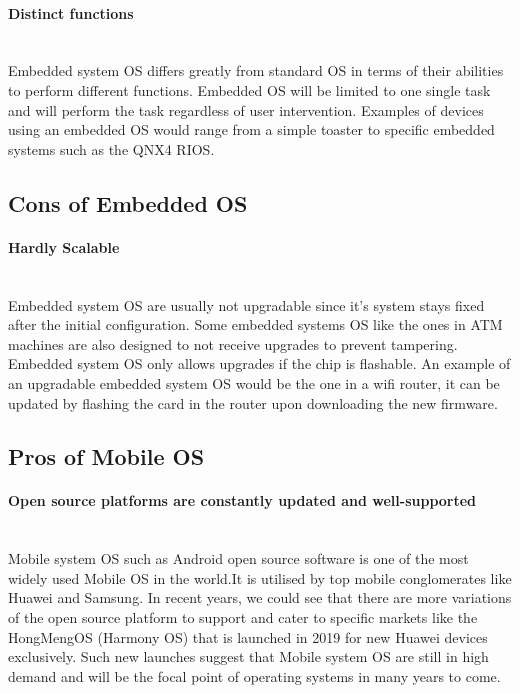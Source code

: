 \documentclass[conference]{IEEEtran}
\newcommand{\forceindent}{\leavevmode{\parindent=1em\indent}}
\begin{document}
\paragraph{Distinct functions} \mbox{} \\
\forceindent Embedded system OS differs greatly from standard OS in terms of their abilities to perform different functions. Embedded OS will be limited to one single task and will perform the task regardless of user intervention. Examples of devices using an embedded OS would range from a simple toaster to specific embedded systems such as the QNX4 RIOS\cite{NOSvsEOS}.

\subsection{Cons of Embedded OS}
\paragraph{Hardly Scalable} \mbox{} \\
\forceindent Embedded system OS are usually not upgradable since it's system stays fixed after the initial configuration. Some embedded systems OS like the ones in  ATM machines are also designed to not receive upgrades to prevent tampering. Embedded system OS only allows upgrades if the chip is flashable. An example of an upgradable embedded system OS would be the one in a wifi router, it can be updated by flashing the card in the router upon downloading the new firmware\cite{lifewire}.

\subsection{Pros of Mobile OS}
\paragraph{Open source platforms are constantly updated and well-supported} \mbox{} \\
\forceindent Mobile  system OS such as Android open source software is one of the most widely used Mobile OS in the world.It is utilised by top mobile conglomerates like Huawei and Samsung. In recent years, we could see that there are more variations of the open source platform to support and cater to specific markets like the HongMengOS (Harmony OS) that is launched in 2019 for new Huawei devices exclusively\cite{HuaweiHongmeng}. Such new launches suggest that Mobile system OS are still in high demand and will be the focal point of operating systems in many years to come.
\end{document}
